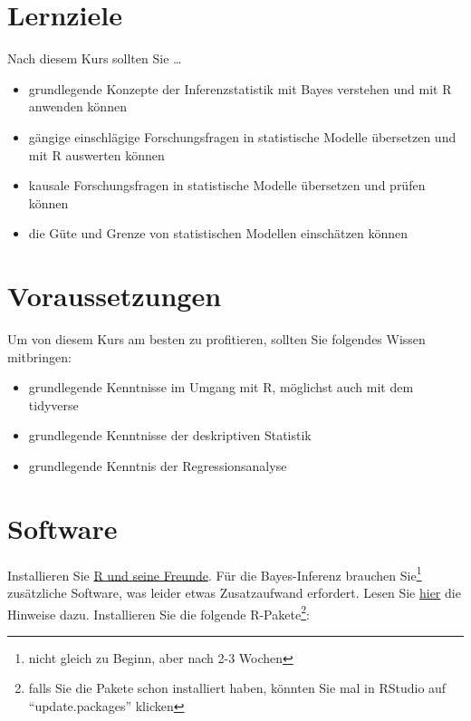 \documentclass[
  a4paper,
  DIV=11]{scrreprt}
\providecommand{\tightlist}{%
  \setlength{\itemsep}{0pt}\setlength{\parskip}{0pt}}\usepackage{longtable,booktabs,array}
\theoremstyle{definition}
\theoremstyle{remark}
\begin{document}
\hypertarget{lernziele}{%
\section*{Lernziele}\label{lernziele}}

Nach diesem Kurs sollten Sie \ldots{}

\begin{itemize}
\tightlist
\item
  grundlegende Konzepte der Inferenzstatistik mit Bayes verstehen und
  mit R anwenden können
\item
  gängige einschlägige Forschungsfragen in statistische Modelle
  übersetzen und mit R auswerten können
\item
  kausale Forschungsfragen in statistische Modelle übersetzen und prüfen
  können
\item
  die Güte und Grenze von statistischen Modellen einschätzen können
\end{itemize}

\hypertarget{voraussetzungen}{%
\section*{Voraussetzungen}\label{voraussetzungen}}

Um von diesem Kurs am besten zu profitieren, sollten Sie folgendes
Wissen mitbringen:

\begin{itemize}
\tightlist
\item
  grundlegende Kenntnisse im Umgang mit R, möglichst auch mit dem
  tidyverse
\item
  grundlegende Kenntnisse der deskriptiven Statistik
\item
  grundlegende Kenntnis der Regressionsanalyse
\end{itemize}

\hypertarget{software}{%
\section*{Software}\label{software}}

Installieren Sie
\href{https://data-se.netlify.app/2021/11/30/installation-von-r-und-seiner-freunde/}{R
und seine Freunde}. Für die Bayes-Inferenz brauchen Sie\footnote{nicht
  gleich zu Beginn, aber nach 2-3 Wochen} zusätzliche Software, was
leider etwas Zusatzaufwand erfordert. Lesen Sie
\href{https://data-se.netlify.app/2022/01/28/bayes-software-installieren-f\%C3\%BCr-r/}{hier}
die Hinweise dazu. Installieren Sie die folgende R-Pakete\footnote{falls
  Sie die Pakete schon installiert haben, könnten Sie mal in RStudio auf
  ``update.packages'' klicken}:
\end{document}
